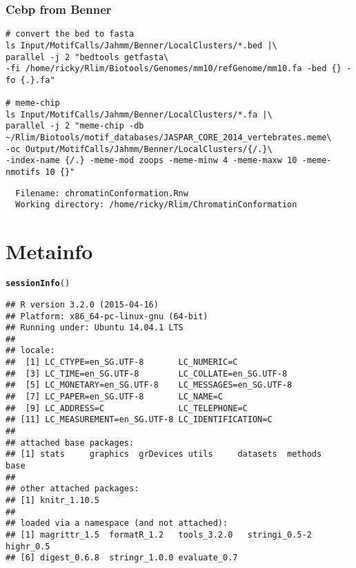 \documentclass{article}\usepackage[]{graphicx}\usepackage[]{color}
\makeatletter
\newcommand{\hlstd}[1]{\textcolor[rgb]{0.345,0.345,0.345}{#1}}%
\newcommand{\hlkwd}[1]{\textcolor[rgb]{0.737,0.353,0.396}{\textbf{#1}}}%
\newenvironment{kframe}{%
 \def\at@end@of@kframe{}%
 \ifinner\ifhmode%
  \def\at@end@of@kframe{\end{minipage}}%
  \begin{minipage}{\columnwidth}%
 \fi\fi%
 \def\FrameCommand##1{\hskip\@totalleftmargin \hskip-\fboxsep
 \colorbox{shadecolor}{##1}\hskip-\fboxsep
     \hskip-\linewidth \hskip-\@totalleftmargin \hskip\columnwidth}%
 \MakeFramed {\advance\hsize-\width
   \@totalleftmargin\z@ \linewidth\hsize
   \@setminipage}}%
 {\par\unskip\endMakeFramed%
 \at@end@of@kframe}
\newenvironment{knitrout}{}{} %
\makeatother
\begin{document}
\subsubsection{Cebp from Benner}
\begin{verbatim}
# convert the bed to fasta
ls Input/MotifCalls/Jahmm/Benner/LocalClusters/*.bed |\ 
parallel -j 2 "bedtools getfasta\ 
-fi /home/ricky/Rlim/Biotools/Genomes/mm10/refGenome/mm10.fa -bed {} -fo {.}.fa"

# meme-chip
ls Input/MotifCalls/Jahmm/Benner/LocalClusters/*.fa |\ 
parallel -j 2 "meme-chip -db ~/Rlim/Biotools/motif_databases/JASPAR_CORE_2014_vertebrates.meme\ 
-oc Output/MotifCalls/Jahmm/Benner/LocalClusters/{/.}\ 
-index-name {/.} -meme-mod zoops -meme-minw 4 -meme-maxw 10 -meme-nmotifs 10 {}"
\end{verbatim}


\begin{verbatim}
  Filename: chromatinConformation.Rnw
  Working directory: /home/ricky/Rlim/ChromatinConformation 
\end{verbatim}

\section{Metainfo}
\begin{knitrout}
\definecolor{shadecolor}{rgb}{0.969, 0.969, 0.969}\color{fgcolor}\begin{kframe}
\begin{alltt}
\hlkwd{sessionInfo}\hlstd{()}
\end{alltt}
\begin{verbatim}
## R version 3.2.0 (2015-04-16)
## Platform: x86_64-pc-linux-gnu (64-bit)
## Running under: Ubuntu 14.04.1 LTS
## 
## locale:
##  [1] LC_CTYPE=en_SG.UTF-8       LC_NUMERIC=C              
##  [3] LC_TIME=en_SG.UTF-8        LC_COLLATE=en_SG.UTF-8    
##  [5] LC_MONETARY=en_SG.UTF-8    LC_MESSAGES=en_SG.UTF-8   
##  [7] LC_PAPER=en_SG.UTF-8       LC_NAME=C                 
##  [9] LC_ADDRESS=C               LC_TELEPHONE=C            
## [11] LC_MEASUREMENT=en_SG.UTF-8 LC_IDENTIFICATION=C       
## 
## attached base packages:
## [1] stats     graphics  grDevices utils     datasets  methods   base     
## 
## other attached packages:
## [1] knitr_1.10.5
## 
## loaded via a namespace (and not attached):
## [1] magrittr_1.5  formatR_1.2   tools_3.2.0   stringi_0.5-2 highr_0.5    
## [6] digest_0.6.8  stringr_1.0.0 evaluate_0.7
\end{verbatim}
\end{kframe}
\end{knitrout}
\end{document}
